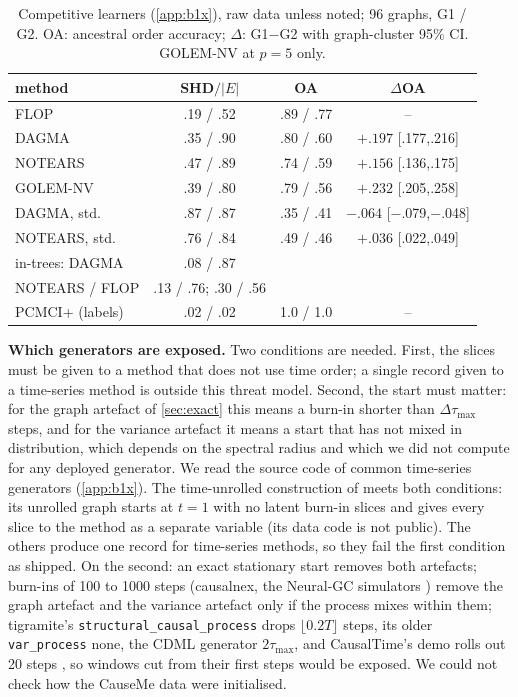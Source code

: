 \documentclass[pdflatex,sn-apa]{sn-jnl}
\theoremstyle{thmstyleone}
\theoremstyle{thmstylethree}
\theoremstyle{thmstyletwo}
\begin{document}
\begin{table}[t]
\caption{Competitive learners (\cref{app:b1x}), raw data unless noted; 96
graphs, G1 / G2. OA: ancestral order accuracy; $\Delta$: G1$-$G2 with
graph-cluster 95\% CI. GOLEM-NV at $p=5$ only.}
\label{tab:b1x}
\centering\setlength{\tabcolsep}{2.5pt}
\begin{tabular}{lccc}
\toprule
method & SHD$/|E|$ & OA & $\Delta$OA \\
\midrule
FLOP & .19 / .52 & .89 / .77 & -- \\
DAGMA & .35 / .90 & .80 / .60 & $+.197$ [.177,.216] \\
NOTEARS & .47 / .89 & .74 / .59 & $+.156$ [.136,.175] \\
GOLEM-NV & .39 / .80 & .79 / .56 & $+.232$ [.205,.258] \\
DAGMA, std. & .87 / .87 & .35 / .41 & $-.064$ [$-$.079,$-$.048] \\
NOTEARS, std. & .76 / .84 & .49 / .46 & $+.036$ [.022,.049] \\
in-trees: DAGMA & .08 / .87 & & \\
\quad NOTEARS / FLOP & .13 / .76; .30 / .56 & & \\
PCMCI+ (labels) & .02 / .02 & 1.0 / 1.0 & -- \\
\bottomrule
\end{tabular}
\end{table}

\textbf{Which generators are exposed.} Two conditions are needed. First, the
slices must be given to a method that does not use time order; a single
record given to a time-series method is outside this threat model. Second,
the start must matter: for the graph artefact of \cref{sec:exact} this means
a burn-in shorter than $\Delta\tau_{\max}$ steps, and for the variance
artefact it means a start that has not mixed in distribution, which depends on
the spectral radius and which we did not compute for any deployed generator.
We read the source code of common time-series generators (\cref{app:b1x}).
The time-unrolled construction of \citet{reisach2026topological} meets both
conditions: its unrolled graph starts at $t=1$ with no latent burn-in slices and gives every slice to the
method as a separate variable (its data code is not public). The others
produce one record for time-series methods, so they fail the first condition
as shipped. On the second: an exact stationary start
\citep{herman2025unitless} removes both artefacts; burn-ins of 100 to 1000
steps (causalnex, the Neural-GC simulators \citep{tank2021neural}) remove the
graph artefact and the variance artefact only if the process mixes within
them; tigramite's \texttt{structural\_causal\_process} \citep{tigramite} drops
$\lfloor0.2T\rfloor$ steps, its older \texttt{var\_process} none, the CDML
generator \citep{lawrence2021dgp} $2\tau_{\max}$, and CausalTime's demo rolls
out 20 steps \citep{cheng2024causaltime}, so windows cut from their first
steps would be exposed. We could not check how the CauseMe data were
initialised.
\end{document}
